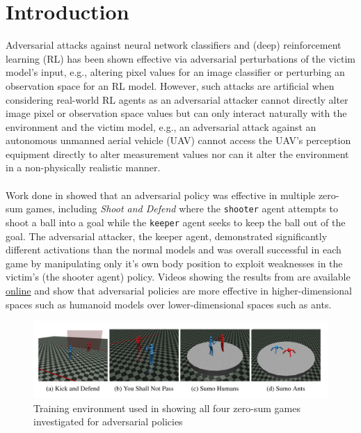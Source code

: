 \documentclass{article}
\begin{document}
\section{Introduction}\label{sec:intro}
Adversarial attacks against neural network classifiers \cite{Szegedy2014} and (deep) reinforcement learning (RL) \cite{Gleave2019} has been shown effective via adversarial perturbations of the victim model's input, e.g., altering pixel values for an image classifier or perturbing an observation space for an RL model. 
However, such attacks are artificial when considering real-world RL agents as an adversarial attacker cannot directly alter image pixel or observation space values but can only interact naturally with the environment and the victim model, e.g., an adversarial attack against an autonomous unmanned aerial vehicle (UAV) cannot access the UAV's perception equipment directly to alter measurement values nor can it alter the environment in a non-physically realistic manner.  \\ \\
\noindent 
Work done in \cite{Gleave2019} showed that an adversarial policy was effective in multiple zero-sum games, including \textit{Shoot and Defend} where the \texttt{shooter} agent attempts to shoot a ball into a goal while the \texttt{keeper} agent seeks to keep the ball out of the goal. 
The adversarial attacker, the keeper agent, demonstrated significantly different activations than the normal models and was overall successful in each game by manipulating only it's own body position to exploit weaknesses in the victim's (the shooter agent) policy.
Videos showing the results from \cite{Gleave2019} are available \href{https://adversarialpolicies.github.io/}{online} and show that adversarial policies are more effective in higher-dimensional spaces such as humanoid models over lower-dimensional spaces such as ants. 

\begin{figure}[h!]
  \includegraphics[width=\linewidth]{imgs/Gleave2019_env}
  \caption{Training environment used in \cite{Gleave2019} showing all four zero-sum games investigated for adversarial policies}
  \label{fig:gleave_env}
\end{figure}
\end{document}
